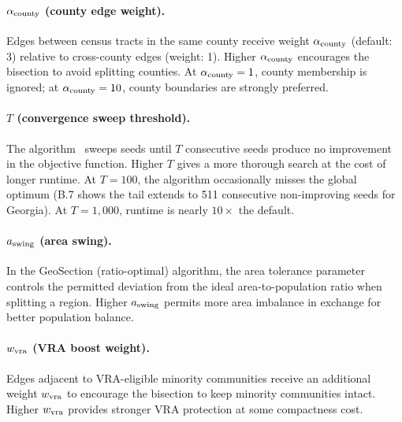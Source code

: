 \paragraph{$\alpha_{\mathrm{county}}$ (county edge weight).}
Edges between census tracts in the same county receive weight $\alpha_{\mathrm{county}}$
(default: 3) relative to cross-county edges (weight: 1).
Higher $\alpha_{\mathrm{county}}$ encourages the bisection to avoid splitting counties.
At $\alpha_{\mathrm{county}} = 1$, county membership is ignored; at $\alpha_{\mathrm{county}} = 10$,
county boundaries are strongly preferred.

\paragraph{$T$ (convergence sweep threshold).}
The \cs{} algorithm~\citep{b16paper} sweeps seeds until $T$ consecutive
seeds produce no improvement in the objective function.
Higher $T$ gives a more thorough search at the cost of longer runtime.
At $T = 100$, the algorithm occasionally misses the global optimum
(B.7 shows the tail extends to 511 consecutive non-improving seeds for Georgia).
At $T = 1{,}000$, runtime is nearly $10\times$ the default.

\paragraph{$a_{\mathrm{swing}}$ (area swing).}
In the GeoSection (ratio-optimal) algorithm, the area tolerance parameter
controls the permitted deviation from the ideal area-to-population ratio
when splitting a region.
Higher $a_{\mathrm{swing}}$ permits more area imbalance in exchange for better
population balance.

\paragraph{$w_{\mathrm{vra}}$ (VRA boost weight).}
Edges adjacent to VRA-eligible minority communities receive an additional
weight $w_{\mathrm{vra}}$ to encourage the bisection to keep minority communities
intact.
Higher $w_{\mathrm{vra}}$ provides stronger VRA protection at some compactness cost.
